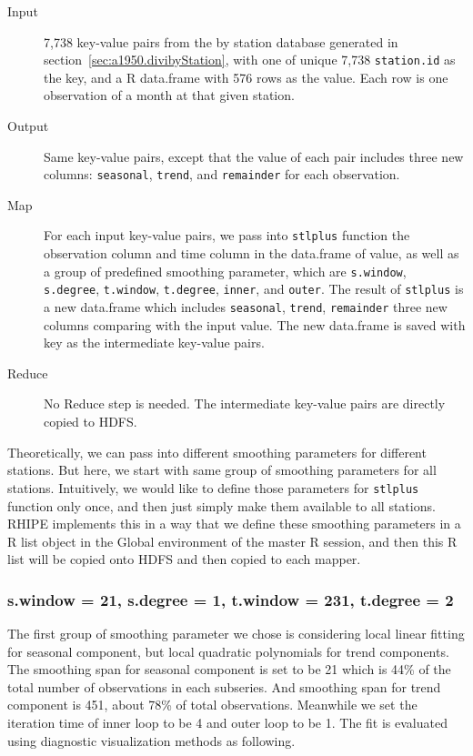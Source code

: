 \begin{description}
  \item[Input] 7,738 key-value pairs from the by station database generated in 
  section~\ref{sec:a1950.divibyStation}, with one of unique 7,738 
  \texttt{station.id} as the key, and a R data.frame with 576 rows as the value.
  Each row is one observation of a month at that given station. 
  \item[Output] Same key-value pairs, except that the value of each pair includes
  three new columns: \texttt{seasonal}, \texttt{trend}, and \texttt{remainder} 
  for each observation.
  \item[Map] For each input key-value pairs, we pass into \texttt{stlplus}
  function the observation column and time column in the data.frame of value, as
  well as a group of predefined smoothing parameter, which are \texttt{s.window},
  \texttt{s.degree}, \texttt{t.window}, \texttt{t.degree}, \texttt{inner}, and
  \texttt{outer}. The result of \texttt{stlplus} is a new data.frame which 
  includes \texttt{seasonal}, \texttt{trend}, \texttt{remainder} three new columns
  comparing with the input value. The new data.frame is saved with key as the 
  intermediate key-value pairs.
  \item[Reduce] No Reduce step is needed. The intermediate key-value pairs are 
  directly copied to HDFS.
\end{description}

Theoretically, we can pass into different smoothing parameters for different 
stations. But here, we start with same group of smoothing parameters for all 
stations. Intuitively, we would like to define those parameters for 
\texttt{stlplus} function only once, and then just simply make them available to
all stations. RHIPE implements this in a way that we define these smoothing 
parameters in a R list object in the Global environment of the master R session,
and then this R list will be copied onto HDFS and then copied to each mapper.

\subsubsection{s.window = 21, s.degree = 1, t.window = 231, t.degree = 2}

The first group of smoothing parameter we chose is considering local linear 
fitting for seasonal component, but local quadratic polynomials for trend 
components. The smoothing span for seasonal
component is set to be 21 which is 44\% of the total number of observations in 
each subseries. And smoothing span for trend component is 451, about 78\% of total
observations. Meanwhile we set the iteration time of inner loop to be 4 and 
outer loop to be 1. The fit is evaluated using diagnostic visualization methods
as following. 


